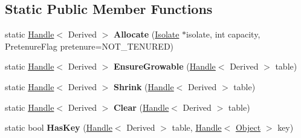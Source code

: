 \subsection*{Static Public Member Functions}
\begin{DoxyCompactItemize}
\item 
static \hyperlink{classv8_1_1internal_1_1_handle}{Handle}$<$ Derived $>$ {\bfseries Allocate} (\hyperlink{classv8_1_1internal_1_1_isolate}{Isolate} $\ast$isolate, int capacity, Pretenure\+Flag pretenure=N\+O\+T\+\_\+\+T\+E\+N\+U\+R\+ED)\hypertarget{classv8_1_1internal_1_1_ordered_hash_table_a52a1a44b8dbc3655952f6e41dcf2f68c}{}\label{classv8_1_1internal_1_1_ordered_hash_table_a52a1a44b8dbc3655952f6e41dcf2f68c}

\item 
static \hyperlink{classv8_1_1internal_1_1_handle}{Handle}$<$ Derived $>$ {\bfseries Ensure\+Growable} (\hyperlink{classv8_1_1internal_1_1_handle}{Handle}$<$ Derived $>$ table)\hypertarget{classv8_1_1internal_1_1_ordered_hash_table_ae177749413455eee0ddc92d44ad2d1a4}{}\label{classv8_1_1internal_1_1_ordered_hash_table_ae177749413455eee0ddc92d44ad2d1a4}

\item 
static \hyperlink{classv8_1_1internal_1_1_handle}{Handle}$<$ Derived $>$ {\bfseries Shrink} (\hyperlink{classv8_1_1internal_1_1_handle}{Handle}$<$ Derived $>$ table)\hypertarget{classv8_1_1internal_1_1_ordered_hash_table_ac1b5d33ee2dd5b492c85e27e3a1ff25d}{}\label{classv8_1_1internal_1_1_ordered_hash_table_ac1b5d33ee2dd5b492c85e27e3a1ff25d}

\item 
static \hyperlink{classv8_1_1internal_1_1_handle}{Handle}$<$ Derived $>$ {\bfseries Clear} (\hyperlink{classv8_1_1internal_1_1_handle}{Handle}$<$ Derived $>$ table)\hypertarget{classv8_1_1internal_1_1_ordered_hash_table_af6025a9e1e004a9b03b16aa34bda1866}{}\label{classv8_1_1internal_1_1_ordered_hash_table_af6025a9e1e004a9b03b16aa34bda1866}

\item 
static bool {\bfseries Has\+Key} (\hyperlink{classv8_1_1internal_1_1_handle}{Handle}$<$ Derived $>$ table, \hyperlink{classv8_1_1internal_1_1_handle}{Handle}$<$ \hyperlink{classv8_1_1internal_1_1_object}{Object} $>$ key)\hypertarget{classv8_1_1internal_1_1_ordered_hash_table_a61f173611d49658965a18d1c35b59c95}{}\label{classv8_1_1internal_1_1_ordered_hash_table_a61f173611d49658965a18d1c35b59c95}

\end{DoxyCompactItemize}
